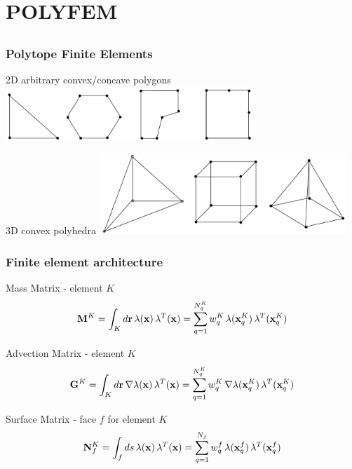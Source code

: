 \documentclass[compress,10pt]{beamer}
\renewcommand{\vec}[1]{\mathbf{#1}}
\begin{document}
\section{POLYFEM}
\subsection{}
\begin{frame}[t]\frametitle{Polytope Finite Elements}
\centering
\begin{block}{2D arbitrary convex/concave polygons}
\centering
\includegraphics[width=0.70\textwidth]{images/arbitrary_polygons.png}
\end{block}
\vspace{0.5cm}
\begin{block}{3D convex polyhedra}
\centering
\includegraphics[width=0.70\textwidth]{images/arbitrary_polyhedra.png}
\end{block}
\end{frame}
\begin{frame}[t]\frametitle{Finite element architecture}
\begin{block}{Mass Matrix - element $K$}
\begin{equation*}
{\bf M}^K = \int_{K} d\vec{r} \, \lambda (\vec{x}) \, \lambda^T (\vec{x})  =  \sum\displaylimits_{q=1}^{N_q^K} w_q^K \, \lambda (\vec{x}_q^K) \, \lambda^T (\vec{x}_q^K) 
\end{equation*}
\end{block}
\begin{block}{Advection Matrix - element $K$}
\begin{equation*}
{\bf G}^K = \int_{K} d\vec{r} \, \vec{\nabla} \lambda (\vec{x}) \, \lambda^T (\vec{x}) = \sum\displaylimits_{q=1}^{N_q^K}  w_q^K \, \vec{\nabla} \lambda (\vec{x}_q^K) \, \lambda^T (\vec{x}_q^K) 
\end{equation*}
\end{block}
\begin{block}{Surface Matrix - face $f$ for element $K$}
\begin{equation*}
{\bf N}_f^K = \int_{f} ds \, \lambda (\vec{x}) \, \lambda^T (\vec{x})  = \sum\displaylimits_{q=1}^{N_f}  w_q^f \, \lambda (\vec{x}_q^f) \, \lambda^T (\vec{x}_q^f) 
\end{equation*}
\end{block}
\end{frame}
\end{document}
